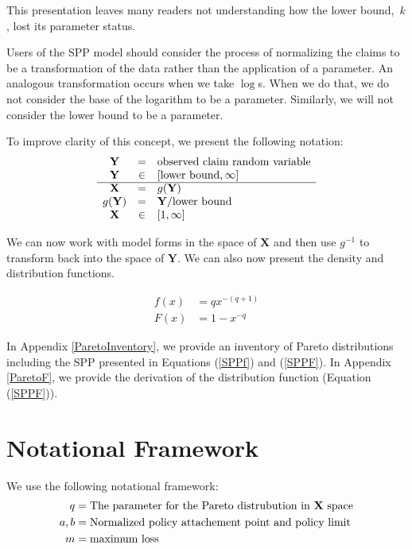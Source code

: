 \documentclass[]{article} %
\begin{document}
This presentation leaves many readers not understanding how the lower bound,~$k$,  lost its parameter status. 

Users of the SPP model should consider the process of normalizing the claims to be a transformation of the data rather than the application of a parameter. An analogous transformation occurs when we take $\log$s. When we do that, we do not consider the base of the logarithm to be a parameter. Similarly, we will not consider the lower bound to be a parameter.

To improve clarity of this concept, we present the following notation:
\begin{eqnarray}
	\begin{array}{ccl}
		\mathbf{Y} & = & \text{observed claim random variable} \\ 
		\mathbf{Y}& \in &  [\text{lower bound}, \infty]\\
		\cline{1-3}
		\mathbf{X} & =  & g(\mathbf{Y})\\
		g(\mathbf{Y}) & =  & \mathbf{Y}/\text{lower bound}\\
		\mathbf{X}& \in &  [1, \infty]\\
	\end{array} 
\end{eqnarray}

We can now work with model forms in the space of $\mathbf{X}$ and then use $g^{-1}$ to transform back into the space of $\mathbf{Y}$. We can also now present the density and distribution functions.

\begin{align}
		f(x) & =  qx^{-(q+1)}\label{SPPf}\\
		F(x) & =  1 - x^{-q}\label{SPPF}
\end{align}

In Appendix \ref{ParetoInventory}, we provide an inventory of Pareto distributions including the SPP presented in Equations (\ref{SPPf}) and (\ref{SPPF}). In  Appendix \ref{ParetoF}, we provide the derivation of the distribution function (Equation (\ref{SPPF})).

\section{Notational Framework}
We use the following notational framework:
\begin{align}
q &= \text{The parameter for the Pareto distrubution in \textbf{X} space}\\
a, b &= \text{Normalized policy attachement point and policy limit}\\
m &= \text{maximum loss}
\end{align}
\end{document}
